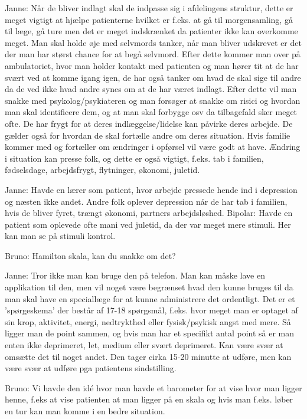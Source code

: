 Janne: Når de bliver indlagt skal de indpasse sig i afdelingens struktur, dette er meget vigtigt at hjælpe patienterne hvilket er f.eks. at gå til morgensamling, gå til læge, gå ture men det er meget indskrænket da patienter ikke kan overkomme meget. Man skal holde øje med selvmords tanker, når man bliver udskrevet er det der man har størst chance for at begå selvmord. Efter dette kommer man over på ambulatoriet, hvor man holder kontakt med patienten og man hører tit at de har svært ved at komme igang igen, de har også tanker om hvad de skal sige til andre da de ved ikke hvad andre synes om at de har været indlagt. Efter dette vil man snakke med psykolog/psykiateren og man forsøger at snakke om risici og hvordan man skal identificere dem, og at man skal forbygge osv da tilbagefald sker meget ofte. De har frygt for at deres indlæggelse/lidelse kan påvirke deres arbejde. De gælder også for hvordan de skal fortælle andre om deres situation. Hvis familie kommer med og fortæller om ændringer i opførsel vil være godt at have. Ændring i situation kan presse folk, og dette er også vigtigt, f.eks. tab i  familien, fødselsdage, arbejdsfrygt, flytninger, økonomi, juletid.

Janne: Havde en lærer som patient, hvor arbejde pressede hende ind i depression og næsten ikke andet. Andre folk oplever depression når de har tab i familien, hvis de bliver fyret, trængt økonomi, partners arbejdsløshed. Bipolar: Havde en patient som oplevede ofte mani ved juletid, da der var meget mere stimuli. Her kan man se på stimuli kontrol.

Bruno: Hamilton skala, kan du snakke om det?

Janne: Tror ikke man kan bruge den på telefon. Man kan måske lave en applikation til den, men vil noget være begrænset hvad den kunne bruges til da man skal have en speciallæge for at kunne administrere det ordentligt. Det er et 'spørgeskema' der består af 17-18 spørgsmål, f.eks. hvor meget man er optaget af sin krop, aktivitet, energi, nedtrykthed eller fysisk/psykisk angst med mere. Så ligger man de point sammen, og hvis man har et specifikt antal point så er man enten ikke deprimeret, let, medium eller svært deprimeret. Kan være svær at omsætte det til noget andet. Den tager cirka 15-20 minutte at udføre, men kan være svær at udføre pga patientens sindstilling.

Bruno: Vi havde den idé hvor man havde et barometer for at vise hvor man ligger henne, f.eks at vise patienten at man ligger på en skala og hvis man f.eks. løber en tur kan man komme i en bedre situation.

